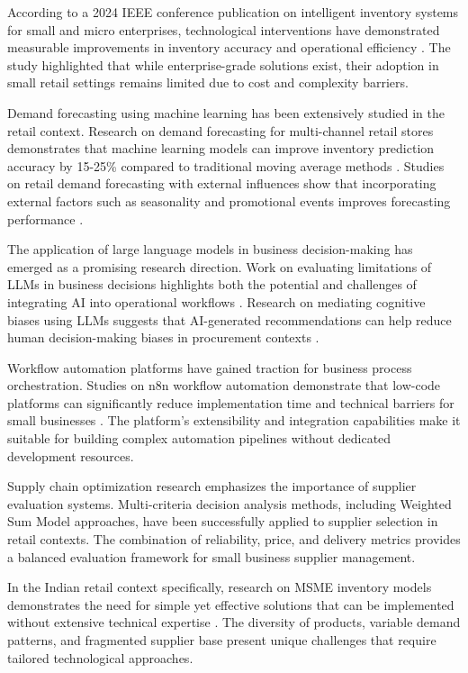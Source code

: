 \documentclass[journal]{IEEEtran}
\begin{document}
According to a 2024 IEEE conference publication on intelligent inventory systems for small and micro enterprises, technological interventions have demonstrated measurable improvements in inventory accuracy and operational efficiency \cite{inventory2024}. The study highlighted that while enterprise-grade solutions exist, their adoption in small retail settings remains limited due to cost and complexity barriers.

Demand forecasting using machine learning has been extensively studied in the retail context. Research on demand forecasting for multi-channel retail stores demonstrates that machine learning models can improve inventory prediction accuracy by 15-25\% compared to traditional moving average methods \cite{forecasting2023}. Studies on retail demand forecasting with external influences show that incorporating external factors such as seasonality and promotional events improves forecasting performance \cite{retail2024}.

The application of large language models in business decision-making has emerged as a promising research direction. Work on evaluating limitations of LLMs in business decisions highlights both the potential and challenges of integrating AI into operational workflows \cite{llm2024}. Research on mediating cognitive biases using LLMs suggests that AI-generated recommendations can help reduce human decision-making biases in procurement contexts \cite{cognitive2025}.

Workflow automation platforms have gained traction for business process orchestration. Studies on n8n workflow automation demonstrate that low-code platforms can significantly reduce implementation time and technical barriers for small businesses \cite{workflow2025}. The platform's extensibility and integration capabilities make it suitable for building complex automation pipelines without dedicated development resources.

Supply chain optimization research emphasizes the importance of supplier evaluation systems. Multi-criteria decision analysis methods, including Weighted Sum Model approaches, have been successfully applied to supplier selection in retail contexts. The combination of reliability, price, and delivery metrics provides a balanced evaluation framework for small business supplier management.

In the Indian retail context specifically, research on MSME inventory models demonstrates the need for simple yet effective solutions that can be implemented without extensive technical expertise \cite{msme2019}. The diversity of products, variable demand patterns, and fragmented supplier base present unique challenges that require tailored technological approaches.
\end{document}
